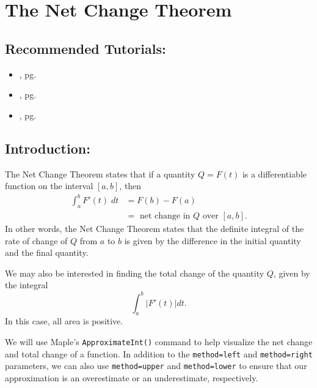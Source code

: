 \section{The Net Change Theorem}
\label{sec:visualizing_the_net_change_theorem}

\subsection*{Recommended Tutorials:}
\begin{itemize}[noitemsep]
    \item {}, pg. \pageref{chp:limits}
    \item {}, pg. \pageref{chp:riemann_sums_and_area_approximation}
	\item {}, pg. \pageref{chp:definite_and_indefinite_Integrals}
\end{itemize}

\subsection*{Introduction:}

The Net Change Theorem states that if a quantity $Q = F(t)$ is a differentiable function on the interval $[a,b]$, then 
\begin{align*}
	\int_{a}^b F'(t) \; dt 
	&= F(b) - F(a) \\
	&= \text{ net change in } Q \text{ over } [a,b].
\end{align*}
In other words, the Net Change Theorem states that the definite integral of the rate of change of $Q$ from $a$ to $b$ is given by the difference in the initial quantity and the final quantity.

We may also be interested in finding the total change of the quantity $Q$, given by the integral
\[
	\int_{a}^{b} |F'(t)| dt.
\]
In this case, all area is positive. 

We will use Maple's \texttt{ApproximateInt()} command to help visualize the net change and total change of a function. In addition to the \texttt{method=left} and \texttt{method=right} parameters, we can also use \newline\noindent\texttt{method=upper} and \texttt{method=lower} to ensure that our approximation is an overestimate or an underestimate, respectively.

